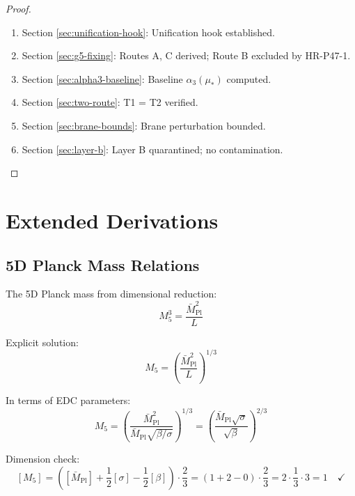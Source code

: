\documentclass[11pt,a4paper]{article}
\theoremstyle{definition}
\begin{document}
\begin{proof}
\begin{enumerate}
  \item Section \ref{sec:unification-hook}: Unification hook established.
  \item Section \ref{sec:g5-fixing}: Routes A, C derived; Route B excluded by HR-P47-1.
  \item Section \ref{sec:alpha3-baseline}: Baseline $\alpha_3(\mu_*)$ computed.
  \item Section \ref{sec:two-route}: T1 = T2 verified.
  \item Section \ref{sec:brane-bounds}: Brane perturbation bounded.
  \item Section \ref{sec:layer-b}: Layer B quarantined; no contamination.
\end{enumerate}
\end{proof}

\section{Extended Derivations}
\label{sec:extended}

\subsection{5D Planck Mass Relations}
\label{subsec:5d-planck}

The 5D Planck mass from dimensional reduction:
\begin{equation}
\label{eq:5d-planck-def}
M_5^3 = \frac{\bar{M}_{\text{Pl}}^2}{L}
\end{equation}

Explicit solution:
\begin{equation}
\label{eq:m5-explicit-sol}
M_5 = \left(\frac{\bar{M}_{\text{Pl}}^2}{L}\right)^{1/3}
\end{equation}

In terms of EDC parameters:
\begin{equation}
\label{eq:m5-edc}
M_5 = \left(\frac{\bar{M}_{\text{Pl}}^2}{\bar{M}_{\text{Pl}}\sqrt{\beta/\sigma}}\right)^{1/3}
  = \left(\frac{\bar{M}_{\text{Pl}} \sqrt{\sigma}}{\sqrt{\beta}}\right)^{2/3}
\end{equation}

Dimension check:
\begin{equation}
\label{eq:m5-dim-check}
[M_5] = \left([{\bar{M}_{\text{Pl}}}] + \frac{1}{2}[\sigma] - \frac{1}{2}[\beta]\right) \cdot \frac{2}{3}
  = \left(1 + 2 - 0\right) \cdot \frac{2}{3} = 2 \cdot \frac{1}{3} \cdot 3 = 1 \quad \checkmark
\end{equation}
\end{document}

